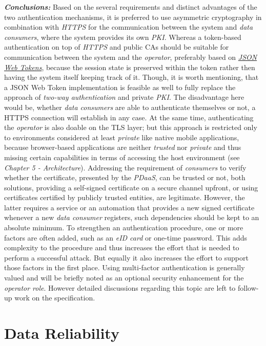 \documentclass[12pt,english,a4paper,titlepage,cleardoublepage=empty,dottedtoc]{report}
\begin{document}
\emph{\textbf{Conclusions:}} Based on the several requirements and
distinct advantages of the two authentication mechanisms, it is
preferred to use asymmetric cryptography in combination with
\emph{HTTPS} for the communication between the system and \emph{data
consumers}, where the system provides its own \emph{PKI}. Whereas a
token-based authentication on top of \emph{HTTPS} and public CAs should
be suitable for communication between the system and the
\emph{operator}, preferably based on
\emph{\protect\hyperlink{def--jwt}{JSON Web Tokens}}, because the
session state is preserved within the token rather then having the
system itself keeping track of it. Though, it is worth mentioning, that
a JSON Web Token implementation is feasible as well to fully replace the
approach of \emph{two-way authentication} and private \emph{PKI}. The
disadvantage here would be, whether \emph{data consumers} are able to
authenticate themselves or not, a HTTPS connection will establish in any
case. At the same time, authenticating the \emph{operator} is also
doable on the TLS layer; but this approach is restricted only to
environments considered at least \emph{private} like native mobile
applications, because browser-based applications are neither
\emph{trusted} nor \emph{private} and thus missing certain capabilities
in terms of accessing the host environment (see \emph{Chapter 5 -
Architecture}). Addressing the requirement of \emph{consumers} to verify
whether the certificate, presented by the \emph{PDaaS}, can be trusted
or not, both solutions, providing a self-signed certificate on a secure
channel upfront, or using certificates certified by publicly trusted
entities, are legitimate. However, the latter requires a service or an
automation that provides a new signed certificate whenever a new
\emph{data consumer} registers, such dependencies should be kept to an
absolute minimum. To strengthen an authentication procedure, one or more
factors are often added, such as an \emph{eID card} or one-time
password. This adds complexity to the procedure and thus increases the
effort that is needed to perform a successful attack. But equally it
also increases the effort to support those factors in the first place.
Using multi-factor authentication is generally valued and will be
briefly noted as an optional security enhancement for the \emph{operator
role}. However detailed discussions regarding this topic are left to
follow-up work on the specification.

\hypertarget{data-reliability}{\section{Data
Reliability}\label{data-reliability}}
\end{document}
